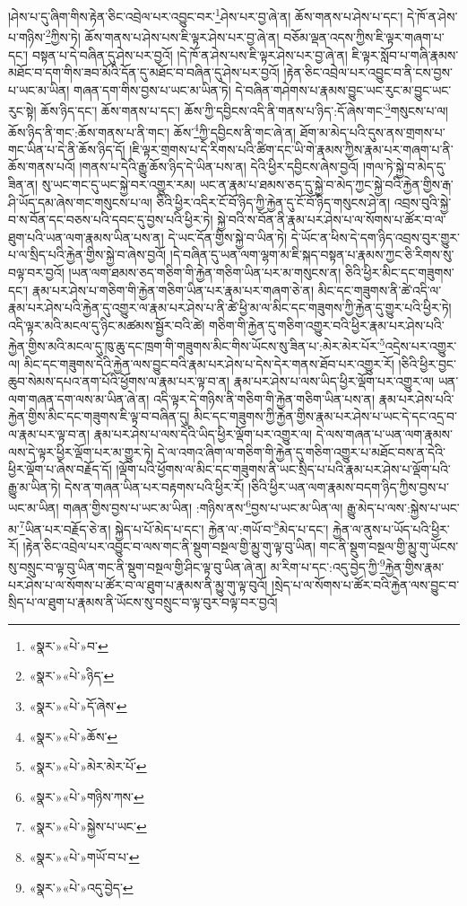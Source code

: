 །ཤེས་པ་དུ་ཞིག་གིས་རྟེན་ཅིང་འབྲེལ་པར་འབྱུང་བར་\footnote{«སྣར་»«པེ་»བ་}ཤེས་པར་བྱ་ཞེ་ན། ཆོས་གནས་པ་ཤེས་པ་དང་། དེ་ཁོ་ན་ཤེས་པ་གཉིས་\footnote{«སྣར་»«པེ་»ཉིད་}ཀྱིས་ཏེ། ཆོས་གནས་པ་ཤེས་པས་ཇི་ལྟར་ཤེས་པར་བྱ་ཞེ་ན། བཅོམ་ལྡན་འདས་ཀྱིས་ཇི་ལྟར་གཞག་པ་དང་། བསྟན་པ་དེ་བཞིན་དུ་ཤེས་པར་བྱའོ། །དེ་ཁོ་ན་ཤེས་པས་ཇི་ལྟར་ཤེས་པར་བྱ་ཞེ་ན། ཇི་ལྟར་སློབ་པ་གཞི་རྣམས་མཐོང་བ་དག་གིས་ཟབ་མོའི་དོན་དུ་མཐོང་བ་བཞིན་དུ་ཤེས་པར་བྱའོ། །རྟེན་ཅིང་འབྲེལ་པར་འབྱུང་བ་ནི་ངས་བྱས་པ་ཡང་མ་ཡིན། གཞན་དག་གིས་བྱས་པ་ཡང་མ་ཡིན་ཏེ། དེ་བཞིན་གཤེགས་པ་རྣམས་བྱུང་ཡང་རུང་མ་བྱུང་ཡང་རུང་སྟེ། ཆོས་ཉིད་དང་། ཆོས་གནས་པ་དང་། ཆོས་ཀྱི་དབྱིངས་འདི་ནི་གནས་པ་ཉིད་:དོ་ཞེས་གང་\footnote{«སྣར་»«པེ་»དོ་ཞེས་}གསུངས་པ་ལ། ཆོས་ཉིད་ནི་གང་:ཆོས་གནས་པ་ནི་གང་། ཆོས་\footnote{«སྣར་»«པེ་»ཆོས་}ཀྱི་དབྱིངས་ནི་གང་ཞེ་ན། ཐོག་མ་མེད་པའི་དུས་ནས་གྲགས་པ་གང་ཡིན་པ་དེ་ནི་ཆོས་ཉིད་དོ། །ཇི་ལྟར་གྲགས་པ་དེ་རིགས་པའི་ཚིག་དང་ཡི་གེ་རྣམས་ཀྱིས་རྣམ་པར་གཞག་པ་ནི་ཆོས་གནས་པའོ། །གནས་པ་དེའི་རྒྱུ་ཆོས་ཉིད་དེ་ཡིན་པས་ན། དེའི་ཕྱིར་དབྱིངས་ཞེས་བྱའོ། །གལ་ཏེ་སྐྱེ་བ་མེད་དུ་ཟིན་ན། སུ་ཡང་གང་དུ་ཡང་སྐྱེ་བར་འགྱུར་རམ། ཡང་ན་རྣམ་པ་ཐམས་ཅད་དུ་སྐྱེ་བ་མེད་ཀྱང་སྐྱེ་བའི་རྐྱེན་གྱིས་རྒ་ཤི་ཡོད་དམ་ཞེས་གང་གསུངས་པ་ལ། ཅིའི་ཕྱིར་འདིར་ངོ་བོ་ཉིད་ཀྱི་རྐྱེན་དུ་ངོ་བོ་ཉིད་གསུངས་ཤེ་ན། འབྲས་བུའི་སྐྱེ་བ་ས་བོན་དང་བཅས་པའི་དབང་དུ་བྱས་པའི་ཕྱིར་ཏེ། སྐྱེ་བའི་ས་བོན་ནི་རྣམ་པར་ཤེས་པ་ལ་སོགས་པ་ཚོར་བ་ལ་ཐུག་པའི་ཡན་ལག་རྣམས་ཡིན་པས་ན། དེ་ཡང་དོན་གྱིས་སྐྱེ་བ་ཡིན་ཏེ། དེ་ཡོང་ན་ཕིས་དེ་དག་ཉིད་འབྲས་བུར་གྱུར་པ་ལ་སྲིད་པའི་རྐྱེན་གྱིས་སྐྱེ་བ་ཞེས་བྱའོ། །དེ་བཞིན་དུ་ཡན་ལག་ལྷག་མ་ཇི་སྐད་བསྟན་པ་རྣམས་ཀྱང་ཅི་རིགས་སུ་བལྟ་བར་བྱའོ། །ཡན་ལག་ཐམས་ཅད་གཅིག་གི་རྐྱེན་གཅིག་ཡིན་པར་མ་གསུངས་ན། ཅིའི་ཕྱིར་མིང་དང་གཟུགས་དང་། རྣམ་པར་ཤེས་པ་གཅིག་གི་རྐྱེན་གཅིག་ཡིན་པར་རྣམ་པར་གཞག་ཅེ་ན། མིང་དང་གཟུགས་ནི་ཚེ་འདི་ལ་རྣམ་པར་ཤེས་པའི་རྐྱེན་དུ་འགྱུར་ལ་རྣམ་པར་ཤེས་པ་ནི་ཚེ་ཕྱི་མ་ལ་མིང་དང་གཟུགས་ཀྱི་རྐྱེན་དུ་གྱུར་པའི་ཕྱིར་ཏེ། འདི་ལྟར་མའི་མངལ་དུ་ཉིང་མཚམས་སྦྱོར་བའི་ཚེ། གཅིག་གི་རྐྱེན་དུ་གཅིག་འགྱུར་བའི་ཕྱིར་རྣམ་པར་ཤེས་པའི་རྐྱེན་གྱིས་མའི་མངལ་དུ་ཁུ་ཆུ་དང་ཁྲག་གི་གཟུགས་མིང་གིས་ཡོངས་སུ་ཟིན་པ་:མེར་མེར་པོར་\footnote{«སྣར་»«པེ་»མེར་མེར་པོ་}འདྲེས་པར་འགྱུར་ལ། མིང་དང་གཟུགས་དེའི་རྐྱེན་ལས་བྱུང་བའི་རྣམ་པར་ཤེས་པ་དེས་དེར་གནས་ཐོབ་པར་འགྱུར་རོ། །ཅིའི་ཕྱིར་བྱང་ཆུབ་སེམས་དཔའ་ནག་པོའི་ཕྱོགས་ལ་རྣམ་པར་ལྟ་བ་ན། རྣམ་པར་ཤེས་པ་ལས་ཡིད་ཕྱིར་ལྡོག་པར་འགྱུར་ལ། ཡན་ལག་གཞན་དག་ལས་མ་ཡིན་ཞེ་ན། འདི་ལྟར་དེ་གཉིས་ནི་གཅིག་གི་རྐྱེན་གཅིག་ཡིན་པས་ན། རྣམ་པར་ཤེས་པའི་རྐྱེན་གྱིས་མིང་དང་གཟུགས་ཇི་ལྟ་བ་བཞིན་དུ། མིང་དང་གཟུགས་ཀྱི་རྐྱེན་གྱིས་རྣམ་པར་ཤེས་པ་ཡང་དེ་དང་འདྲ་བ་ལ་རྣམ་པར་ལྟ་བ་ན། རྣམ་པར་ཤེས་པ་ལས་དེའི་ཡིད་ཕྱིར་ལྡོག་པར་འགྱུར་ལ། དེ་ལས་གཞན་པ་ཡན་ལག་རྣམས་ལས་དེ་ལྟར་ཕྱིར་ལྡོག་པར་མ་གྱུར་ཏེ། དེ་ལ་འགའ་ཞིག་ལ་གཅིག་གི་རྐྱེན་དུ་གཅིག་འགྱུར་པ་མཐོང་བས་ན་དེའི་ཕྱིར་ལྡོག་པ་ཞེས་བརྗོད་དོ། །ལྡོག་པའི་ཕྱོགས་ལ་མིང་དང་གཟུགས་ནི་ཡང་སྲིད་པ་པའི་རྣམ་པར་ཤེས་པ་ལྡོག་པའི་རྒྱུ་མ་ཡིན་ཏེ། དེས་ན་གཞན་ཡིན་པར་བརྟགས་པའི་ཕྱིར་རོ། །ཅིའི་ཕྱིར་ཡན་ལག་རྣམས་བདག་ཉིད་ཀྱིས་བྱས་པ་ཡང་མ་ཡིན། གཞན་གྱིས་བྱས་པ་ཡང་མ་ཡིན། :གཉིས་ནས་\footnote{«སྣར་»«པེ་»གཉིས་ཀས་}བྱས་པ་ཡང་མ་ཡིན་ལ། རྒྱུ་མེད་པ་ལས་:སྐྱེས་པ་ཡང་མ་\footnote{«སྣར་»«པེ་»སྐྱེས་པ་ཡང་}ཡིན་པར་བརྗོད་ཅེ་ན། སྐྱེད་པ་པོ་མེད་པ་དང་། རྐྱེན་ལ་:གཡོ་བ་\footnote{«སྣར་»«པེ་»གཡོ་བ་པ་}མེད་པ་དང་། རྐྱེན་ལ་ནུས་པ་ཡོད་པའི་ཕྱིར་རོ། །རྟེན་ཅིང་འབྲེལ་པར་འབྱུང་བ་ལས་གང་ནི་སྡུག་བསྔལ་གྱི་མྱུ་གུ་ལྟ་བུ་ཡིན། གང་ནི་སྡུག་བསྔལ་གྱི་མྱུ་གུ་ཡོངས་སུ་བསྲུང་བ་ལྟ་བུ་ཡིན་གང་ནི་སྡུག་བསྔལ་གྱི་ཤིང་ལྟ་བུ་ཡིན་ཞེ་ན། མ་རིག་པ་དང་:འདུ་བྱེད་ཀྱི་\footnote{«སྣར་»«པེ་»འདུ་བྱེད་}རྐྱེན་གྱིས་རྣམ་པར་ཤེས་པ་ལ་སོགས་པ་ཚོར་བ་ལ་ཐུག་པ་རྣམས་ནི་མྱུ་གུ་ལྟ་བུའོ། །སྲེད་པ་ལ་སོགས་པ་ཚོར་བའི་རྐྱེན་ལས་བྱུང་བ་སྲིད་པ་ལ་ཐུག་པ་རྣམས་ནི་ཡོངས་སུ་བསྲུང་བ་ལྟ་བུར་བལྟ་བར་བྱའོ། 